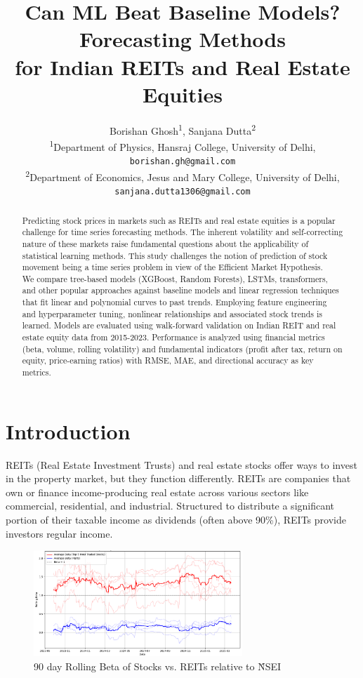 \documentclass[11pt]{article}
\title{Can ML Beat Baseline Models? Forecasting Methods \\ for Indian REITs and Real Estate Equities}
\author{
    Borishan Ghosh\textsuperscript{1}, Sanjana Dutta\textsuperscript{2} \\
    \small \textsuperscript{1}Department of Physics, Hansraj College, University of Delhi, \texttt{borishan.gh@gmail.com} \\
    \small \textsuperscript{2}Department of Economics, Jesus and Mary College, University of Delhi, \texttt{sanjana.dutta1306@gmail.com}
}
\date{\vspace{-2ex}}
\begin{document}
\maketitle

\begin{abstract}
    \noindent Predicting stock prices in markets such as REITs and real estate equities is a popular challenge for time series forecasting methods. The inherent volatility and self-correcting nature of these markets raise fundamental questions about the applicability of statistical learning methods. This study challenges the notion of prediction of stock movement being a time series problem in view of the Efficient Market Hypothesis. \\
    We compare tree-based models (XGBoost, Random Forests), LSTMs, transformers, and other popular approaches against baseline models and linear regression techniques that fit linear and polynomial curves to past trends. Employing feature engineering and hyperparameter tuning, nonlinear relationships and associated stock trends is learned. Models are evaluated using walk-forward validation on Indian REIT and real estate equity data from 2015-2023. Performance is analyzed using financial metrics (beta, volume, rolling volatility) and fundamental indicators (profit after tax, return on equity, price-earning ratios) with RMSE, MAE, and directional accuracy as key metrics.
\end{abstract}

\section{Introduction}
\label{sec:introduction}
REITs (Real Estate Investment Trusts) and real estate stocks offer ways to invest in the property market, but they function differently. REITs are companies that own or finance income-producing real estate across various sectors like commercial, residential, and industrial. Structured to distribute a significant portion of their taxable income as dividends (often above 90\%), REITs provide investors regular income.

\begin{figure}[htbp]
    \centering
    \includegraphics[width=0.7\textwidth]{figures/rolling_beta.png}
    \caption{90 day Rolling Beta of Stocks vs. REITs relative to \^NSEI}
    \label{fig:sample}
\end{figure}
\end{document}
